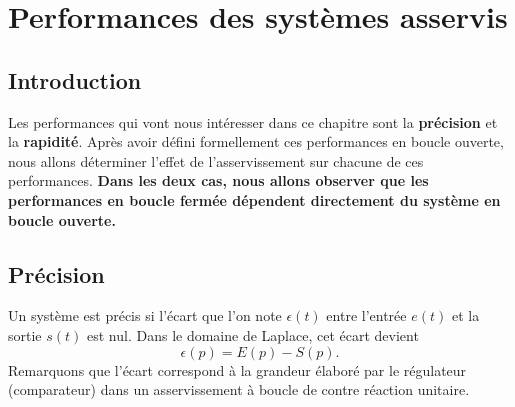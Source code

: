 \chapter[Performances des systèmes]
{Performances des systèmes asservis\label{chap-perf}}
\minitoc
\newpage
\section{Introduction}
Les performances qui vont nous intéresser dans 
ce chapitre sont la \textbf{précision} et la \textbf{rapidité}.
Après avoir défini formellement ces performances en boucle ouverte, 
nous allons déterminer l'effet de l'asservissement sur chacune de 
ces performances. \textbf{Dans les deux cas, nous allons observer que 
les performances en boucle fermée dépendent directement du système 
en boucle ouverte.}
\section{Précision}
Un système est précis si l'écart que l'on note $\epsilon(t)$ 
entre l'entrée $e(t)$ et la sortie $s(t)$ est nul.
Dans le domaine de Laplace, cet écart devient 
\[
\epsilon(p)=E(p)-S(p).
\]
Remarquons que l'écart correspond à la grandeur élaboré par le régulateur 
(comparateur) dans un asservissement à boucle de contre réaction unitaire.


